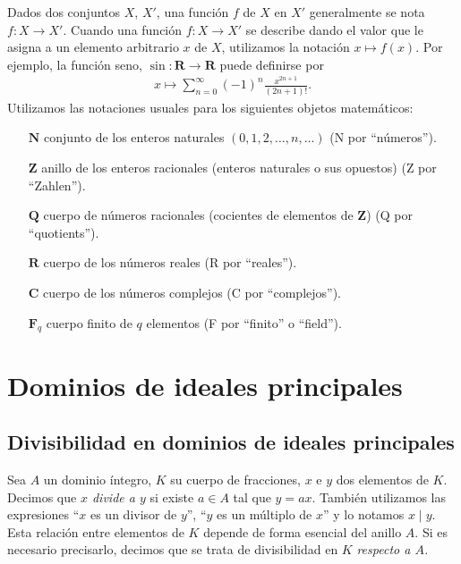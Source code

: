 \documentclass[bibtotoc,leqno,spanish]{amsbook}
\newcommand{\RR}{\mathbf{R}}
\newcommand{\QQ}{\mathbf{Q}}
\newcommand{\ZZ}{\mathbf{Z}}
\newcommand{\NN}{\mathbf{N}}
\newcommand{\FF}{\mathbf{F}}
\newcommand{\CC}{\mathbf{C}}
\renewcommand{\to}[1][]{\xrightarrow{#1}}
\numberwithin{equation}{section}
\theoremstyle{note}
\theoremstyle{note}
\theoremstyle{rem}
\numberwithin{theorem}{section}
\numberwithin{proposition}{section}
\numberwithin{definition}{section}
\numberwithin{lemma}{section}
\numberwithin{corollary}{section}
\numberwithin{example}{section}
\numberwithin{footnote}{section}%
\begin{document}
Dados dos conjuntos $X$, $X'$, una funci\'on $f$ de $X$ en $X'$ generalmente se nota
$f:X\to X'$. Cuando una funci\'on $f:X\to X'$ se describe dando el valor que
le asigna a un elemento arbitrario $x$ de $X$, utilizamos la notaci\'on $x\mapsto f(x)$.
Por ejemplo, la funci\'on seno, $\sin:\RR\to\RR$ puede definirse por
\begin{gather*}
x\mapsto\sum_{n=0}^{\infty}(-1)^{n}\frac{x^{2n+1}}{(2n+1)!}.
\end{gather*}
Utilizamos las notaciones usuales para los siguientes objetos matem\'aticos:
\begin{enumerate}
\item[$\NN$] conjunto de los enteros naturales $(0,1,2,\dots,n,\dots)$ (N por ``n\'umeros'').
\item[$\ZZ$] anillo de los enteros racionales (enteros naturales o sus opuestos)
(Z por ``Zahlen'').
\item[$\QQ$] cuerpo de n\'umeros racionales (cocientes de elementos de $\ZZ$) (Q por
``quotients'').
\item[$\RR$] cuerpo de los n\'umeros reales (R por ``reales'').
\item[$\CC$] cuerpo de los n\'umeros complejos (C por ``complejos'').
\item[$\FF_{q}$] cuerpo finito de $q$ elementos (F por ``finito'' o ``field'').
\end{enumerate}

\mainmatter

\chapter{Dominios de ideales principales}\label{cap1}

\section{Divisibilidad en dominios de ideales principales}\label{sec1.1}

Sea $A$ un dominio \'integro, $K$ su cuerpo de fracciones, $x$ e $y$ dos elementos de $K$.
Decimos que \emph{$x$ divide a $y$} si existe $a\in A$ tal que $y = ax$. Tambi\'en utilizamos
las expresiones ``$x$ es un divisor de $y$'', ``$y$ es un m\'ultiplo de $x$'' y lo notamos $x\mid y$.
Esta relaci\'on entre elementos de $K$ depende de forma esencial del anillo $A$. Si es necesario
precisarlo, decimos que se trata de divisibilidad en $K$ \emph{respecto a $A$.}
\end{document}
